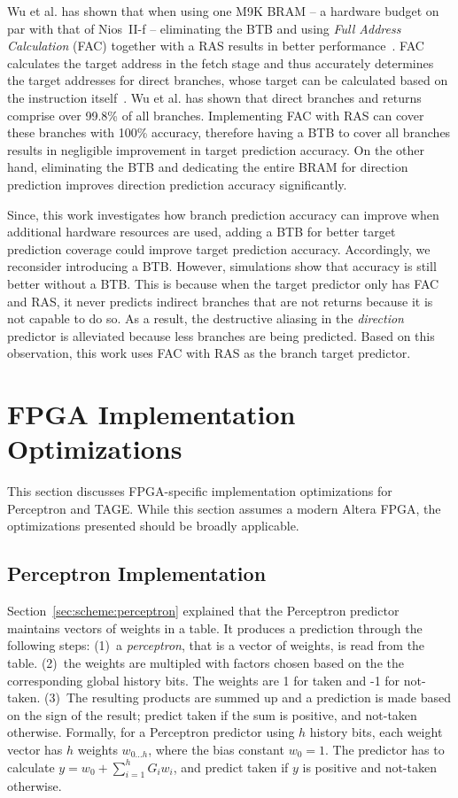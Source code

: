 \documentclass[conference]{IEEEtran}
\begin{document}
Wu et al. has shown that when using  one  M9K BRAM -- a hardware budget on par with that of Nios~II-f -- eliminating the BTB and using \textit{Full Address Calculation} (FAC) together with a RAS results in better performance~\cite{grselect}. FAC  calculates the target address in the fetch stage and thus accurately determines the target addresses for direct branches, whose target can be calculated based on the instruction itself~\cite{niosii}. Wu et al. has shown that direct branches and returns comprise over 99.8\% of all branches. Implementing FAC with RAS can cover these branches with 100\% accuracy, therefore having a BTB to cover all branches results in negligible improvement in target prediction accuracy. On the other hand, eliminating the BTB and dedicating the entire BRAM for direction prediction improves direction prediction accuracy significantly.

Since, this work investigates how branch prediction accuracy can improve when additional hardware resources are used,  adding a BTB for better target prediction coverage could improve target prediction accuracy. Accordingly, we reconsider introducing a BTB. However, simulations show that  accuracy is still better without a BTB. This is because when the target predictor only has FAC and RAS, it never predicts indirect branches that are not returns because it is not capable to do so. As a result, the destructive aliasing in the \textit{direction} predictor is alleviated because less branches are being predicted. Based on this observation, this work uses FAC with RAS as the branch target predictor.


\section{FPGA Implementation Optimizations}
\label{sec:fpga}
This section discusses FPGA-specific implementation optimizations for Perceptron and TAGE. While this section assumes a modern Altera FPGA, the optimizations presented should be broadly applicable.

\subsection{Perceptron Implementation}
\label{sec:fpga:perceptron}

Section~\ref{sec:scheme:perceptron} explained that the Perceptron predictor maintains vectors of weights in a table. It produces a prediction through the following steps: (1)~a \textit{perceptron}, that is a vector of weights, is read from the table. (2)~the weights are multipled with factors chosen based on the the corresponding global history bits. The weights are 1 for taken and -1 for not-taken. (3)~The resulting products are summed up and a prediction is made based on the sign of the result; predict taken if the sum is positive, and not-taken otherwise. Formally, for a Perceptron predictor using $h$ history bits, each weight vector has $h$ weights $w_{0...h}$, where the bias constant $w_0 = 1$. The predictor has to calculate $y = w_0 + \sum_{i=1}^{h} G_iw_i$, and predict taken if $y$ is positive and not-taken otherwise.
\end{document}
